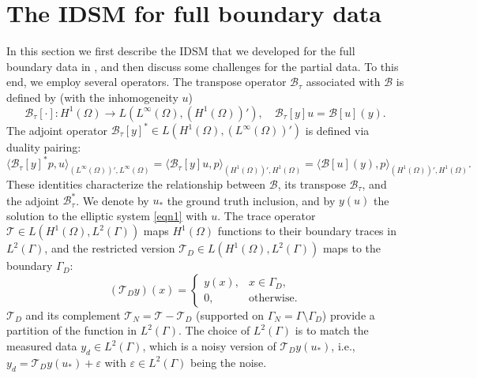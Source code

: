 \documentclass[onefignum,onetabnum]{siamart190516}
\numberwithin{equation}{section}
\begin{document}
\section{The IDSM for full boundary data}\label{sec:MAT}
{In this section we first describe the IDSM that we developed for the full boundary data in \cite{Ito2025Iterative}, and then discuss some challenges for the partial data.} To this end, we employ several operators.
The transpose operator $\mathcal{B}_\tau$ associated with $\mathcal{B}$ is defined by {(with the inhomogeneity $u$)}
\begin{equation}\label{eqn9}
\mathcal{B}_\tau[\cdot] : H^1(\Omega) \to L(L^\infty(\Omega), (H^1(\Omega))'), \quad
\mathcal{B}_\tau[y]u = \mathcal{B}[u](y).
\end{equation}
The adjoint operator $\mathcal{B}_\tau[y]^{*}\in L(H^{1}(\Omega),(L^{\infty}(\Omega))')$ is defined via duality pairing:
\begin{equation*}
\langle \mathcal{B}_{\tau}[y]^{*} p, u \rangle_{(L^\infty(\Omega))', L^\infty(\Omega)} =\langle \mathcal{B}_{\tau}[y]u, p \rangle_{(H^{1}(\Omega))', H^{1}(\Omega)} = \langle \mathcal{B}[u](y), p \rangle_{(H^{1}(\Omega))', H^{1}(\Omega)}.
\end{equation*}
These identities characterize the relationship between $\mathcal{B}$, its transpose $\mathcal{B}_\tau$, and the adjoint $\mathcal{B}_\tau^{*}$.
We denote by $u_{*}$ the ground truth inclusion, and by $y(u)$ the solution to the elliptic system \eqref{eqn1} with $u$.
The trace operator $\mathcal{T} \in L(H^1(\Omega), L^2(\Gamma))$ maps $H^1(\Omega)$ functions to their boundary traces in $L^2(\Gamma)$, and the restricted version $\mathcal{T}_D \in L(H^1(\Omega), L^2(\Gamma))$ maps to the boundary $\Gamma_D$:
\begin{equation*}
(\mathcal{T}_D y)(x) =
\begin{cases}
y(x), & x \in \Gamma_D, \\
0, & \text{otherwise}.
\end{cases}
\end{equation*}
$\mathcal{T}_{D}$ and its complement $\mathcal{T}_N = \mathcal{T} - \mathcal{T}_D$ (supported on $\Gamma_N = \Gamma \setminus \Gamma_D$) provide a partition of the function in $L^{2}(\Gamma)$.
The choice of $L^2(\Gamma)$ is to match the measured data $y_d \in L^2(\Gamma)$, which is a noisy version of $\mathcal{T}_{D}y(u_{*})$, i.e., $y_d = \mathcal{T}_D y(u_*) + \varepsilon$ with $\varepsilon\in L^{2}(\Gamma)$ { being the noise}.
\end{document}
